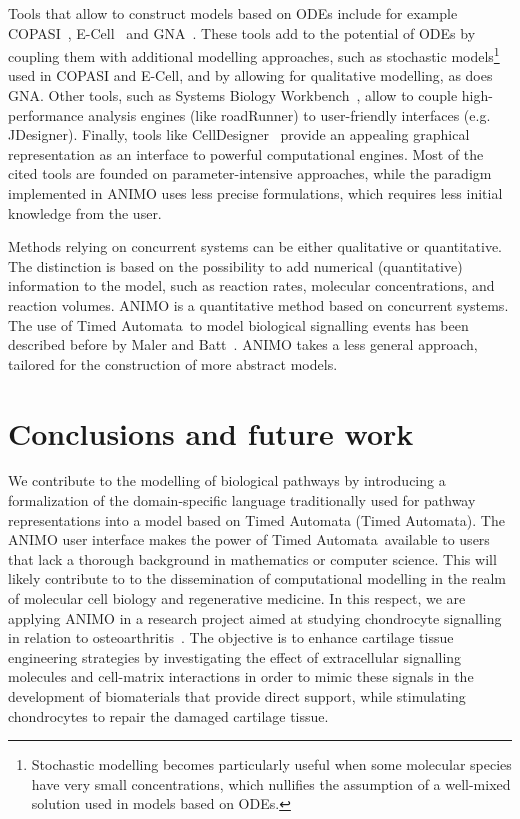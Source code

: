 \documentclass[journal, 10pt]{IEEEtran}
\def\tas{Timed Automata}
\begin{document}
Tools that allow to construct models based on ODEs include for example COPASI~\cite{copasi}, 
E-Cell~\cite{e-cell} and GNA~\cite{gna}.
These tools add to the potential of ODEs by coupling them with additional modelling approaches,
such as stochastic models\footnote{Stochastic modelling becomes particularly useful when some
molecular species have very small concentrations, which nullifies the assumption of a well-mixed solution used in models based on ODEs.}
used in COPASI and E-Cell, and by allowing for qualitative modelling, as does GNA.
Other tools, such as Systems Biology Workbench~\cite{sbw}, allow to couple high-performance
analysis engines (like roadRunner) to user-friendly interfaces (e.g. JDesigner). Finally, tools like CellDesigner~\cite{celldesigner}
provide an appealing graphical representation as an interface to powerful computational engines.
Most of the cited tools are founded on parameter-intensive approaches, while the paradigm implemented in ANIMO
uses less precise formulations, which requires less initial knowledge from the user.


Methods relying on concurrent systems
can be either qualitative or quantitative. The distinction is based on the possibility to add numerical 
(quantitative) information to the model, such as reaction rates, molecular concentrations, and reaction volumes. 
ANIMO is a quantitative method based on concurrent systems. 
The use of \tas\ to model biological signalling events has been described before by Maler and Batt~\cite{oded-ta-discretization}. 
ANIMO takes a less general approach, tailored for the construction of more abstract models.


\section{Conclusions and future work}\label{sec:conclusions}
We contribute to the modelling of biological pathways by introducing a formalization of the
domain-specific language traditionally used for pathway representations into a model based on Timed Automata (\tas).
The ANIMO user interface makes the power of \tas\ available 
to users that lack a thorough background in mathematics or computer science. This will likely contribute to to the 
dissemination of computational modelling in the realm of molecular cell biology and regenerative medicine.
In this respect, we are applying ANIMO in a research project aimed at studying
chondrocyte signalling in relation to osteoarthritis~\cite{oa-bio1,oa-bio2}. The objective is to enhance
cartilage tissue engineering strategies by investigating the effect of
extracellular signalling molecules and cell-matrix interactions in order to mimic
these signals in the development of biomaterials that provide direct
support, while stimulating chondrocytes to repair the damaged cartilage tissue.
\end{document}
